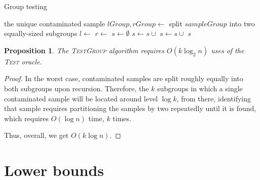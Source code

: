 \documentclass{article}
\newtheorem{proposition}{Proposition}
\begin{document}
\begin{algorithm}[H]
    \caption{Group testing}
    \begin{algorithmic}
                \Return the unique contaminated sample
            \EndIf
            \State $lGroup, rGroup \gets$ split $sampleGroup$ into two equally-sized subgroups
            \State $l \gets$ 
            \State $r \gets$ 
            \State $s \gets \emptyset$
                \State $s \gets s \cup$ 
            \EndIf
                \State $s \gets s \cup$ 
            \EndIf
            \State \Return $s$
        \EndFunction
    \end{algorithmic}
\end{algorithm}

\begin{proposition}
    The \textsc{TestGroup} algorithm requires $O(k\log_2{n})$ uses of the \textsc{Test} oracle.
\end{proposition}

\begin{proof}
    In the worst case, contaminated samples are split roughly equally into both
    subgroups upon recursion. Therefore, the $k$ subgroups in which a single
    contaminated sample will be located around level $\log k$, from there,
    identifying that sample requires partitioning the samples by two repeatedly
    until it is found, which requires $O(\log n)$ time, $k$ times.

    Thus, overall, we get $O(k \log n)$.
\end{proof}

\section{Lower bounds}
\end{document}
